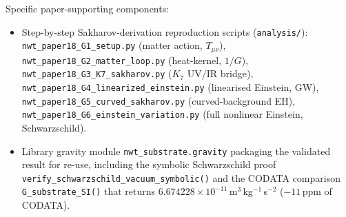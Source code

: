 \documentclass[11pt]{article}
\begin{document}
Specific paper-supporting components:
\begin{itemize}
\item Step-by-step Sakharov-derivation reproduction scripts
  (\texttt{analysis/}): \\
  \texttt{nwt\_\allowbreak paper18\_\allowbreak G1\_\allowbreak setup.py} (matter action, $T_{\mu\nu}$), \\
  \texttt{nwt\_\allowbreak paper18\_\allowbreak G2\_\allowbreak matter\_\allowbreak loop.py} (heat-kernel, $1/G$), \\
  \texttt{nwt\_\allowbreak paper18\_\allowbreak G3\_\allowbreak K7\_\allowbreak sakharov.py} ($K_7$ UV/IR bridge), \\
  \texttt{nwt\_\allowbreak paper18\_\allowbreak G4\_\allowbreak linearized\_\allowbreak einstein.py} (linearised Einstein, GW), \\
  \texttt{nwt\_\allowbreak paper18\_\allowbreak G5\_\allowbreak curved\_\allowbreak sakharov.py} (curved-background EH), \\
  \texttt{nwt\_\allowbreak paper18\_\allowbreak G6\_\allowbreak einstein\_\allowbreak variation.py} (full nonlinear Einstein, Schwarzschild).
\item Library gravity module \texttt{nwt\_substrate.gravity}
  packaging the validated result for re-use, including the symbolic
  Schwarzschild proof
  \texttt{verify\_\allowbreak schwarzschild\_\allowbreak vacuum\_\allowbreak symbolic()}
  and the CODATA comparison
  \texttt{G\_\allowbreak substrate\_\allowbreak SI()} that returns
  $6.674228\times10^{-11}$\,m$^3$\,kg$^{-1}$\,s$^{-2}$ ($-11$\,ppm of CODATA).
\end{itemize}
\end{document}
